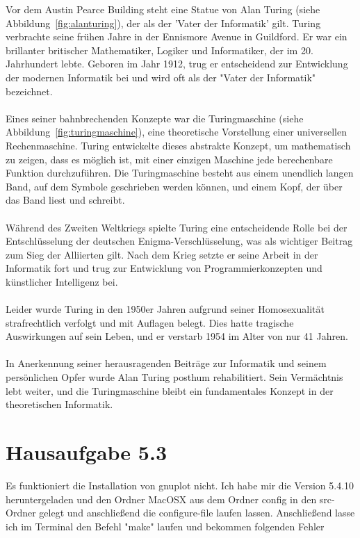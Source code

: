 \documentclass{scrartcl}
\begin{document}
Vor dem Austin Pearce Building steht eine Statue von Alan Turing (siehe Abbildung~\ref{fig:alanturing}), der als der 'Vater der Informatik' gilt. Turing verbrachte seine frühen Jahre in der Ennismore Avenue in Guildford. Er war ein brillanter britischer Mathematiker, Logiker und Informatiker, der im 20. Jahrhundert lebte. Geboren im Jahr 1912, trug er entscheidend zur Entwicklung der modernen Informatik bei und wird oft als der "Vater der Informatik" bezeichnet. \\
\\
Eines seiner bahnbrechenden Konzepte war die Turingmaschine (siehe Abbildung~\ref{fig:turingmaschine}), eine theoretische Vorstellung einer universellen Rechenmaschine. Turing entwickelte dieses abstrakte Konzept, um mathematisch zu zeigen, dass es möglich ist, mit einer einzigen Maschine jede berechenbare Funktion durchzuführen. Die Turingmaschine besteht aus einem unendlich langen Band, auf dem Symbole geschrieben werden können, und einem Kopf, der über das Band liest und schreibt. \\
\\
Während des Zweiten Weltkriegs spielte Turing eine entscheidende Rolle bei der Entschlüsselung der deutschen Enigma-Verschlüsselung, was als wichtiger Beitrag zum Sieg der Alliierten gilt. Nach dem Krieg setzte er seine Arbeit in der Informatik fort und trug zur Entwicklung von Programmierkonzepten und künstlicher Intelligenz bei. \\
\\
Leider wurde Turing in den 1950er Jahren aufgrund seiner Homosexualität strafrechtlich verfolgt und mit Auflagen belegt. Dies hatte tragische Auswirkungen auf sein Leben, und er verstarb 1954 im Alter von nur 41 Jahren. \\
\\
In Anerkennung seiner herausragenden Beiträge zur Informatik und seinem persönlichen Opfer wurde Alan Turing posthum rehabilitiert. Sein Vermächtnis lebt weiter, und die Turingmaschine bleibt ein fundamentales Konzept in der theoretischen Informatik. 

\newpage
\section{Hausaufgabe 5.3}

Es funktioniert die Installation von gnuplot nicht. Ich habe mir die Version 5.4.10 heruntergeladen und den Ordner MacOSX aus dem Ordner config in den src-Ordner gelegt und anschließend die configure-file laufen lassen. Anschließend lasse ich im Terminal den Befehl "make" laufen und bekommen folgenden Fehler 
\end{document}
